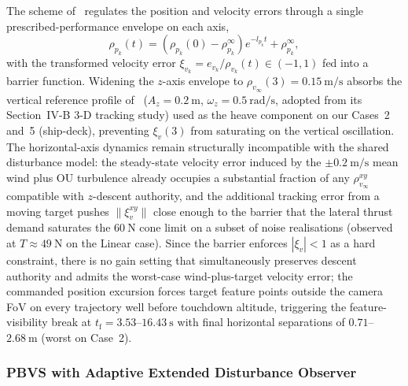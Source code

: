 \documentclass[10pt,journal]{IEEEtran}
\begin{document}
The scheme of~\cite{lin2022} regulates the position and velocity errors through a single prescribed-performance envelope on each axis,
\begin{equation*}
    \rho_{p_k}(t) = (\rho_{p_k}(0)-\rho_{p_k}^\infty)e^{-l_{p_k}t} + \rho_{p_k}^\infty,
\end{equation*}
with the transformed velocity error $\xi_{v_k}=e_{v_k}/\rho_{v_k}(t)\in(-1,1)$ fed into a barrier function. Widening the $z$-axis envelope to $\rho_{v_\infty}(3)=0.15~\text{m/s}$ absorbs the vertical reference profile of~\cite{lin2022} ($A_z=0.2~\text{m}$, $\omega_z=0.5~\text{rad/s}$, adopted from its Section~IV-B 3-D tracking study) used as the heave component on our Cases~2 and~5 (ship-deck), preventing $\xi_{v}(3)$ from saturating on the vertical oscillation. The horizontal-axis dynamics remain structurally incompatible with the shared disturbance model: the steady-state velocity error induced by the $\pm 0.2~\text{m/s}$ mean wind plus OU turbulence already occupies a substantial fraction of any $\rho_{v_\infty}^{xy}$ compatible with $z$-descent authority, and the additional tracking error from a moving target pushes $\|\xi_v^{xy}\|$ close enough to the barrier that the lateral thrust demand saturates the $60~\text{N}$ cone limit on a subset of noise realisations (observed at $T\approx 49~\text{N}$ on the Linear case). Since the barrier enforces $|\xi_v|<1$ as a hard constraint, there is no gain setting that simultaneously preserves descent authority and admits the worst-case wind-plus-target velocity error; the commanded position excursion forces target feature points outside the camera FoV on every trajectory well before touchdown altitude, triggering the feature-visibility break at $t_\text{f}=3.53$--$16.43~\text{s}$ with final horizontal separations of $0.71$--$2.68~\text{m}$ (worst on Case~2).

\subsubsection{PBVS with Adaptive Extended Disturbance Observer \cite{zhang2026}}
\end{document}
